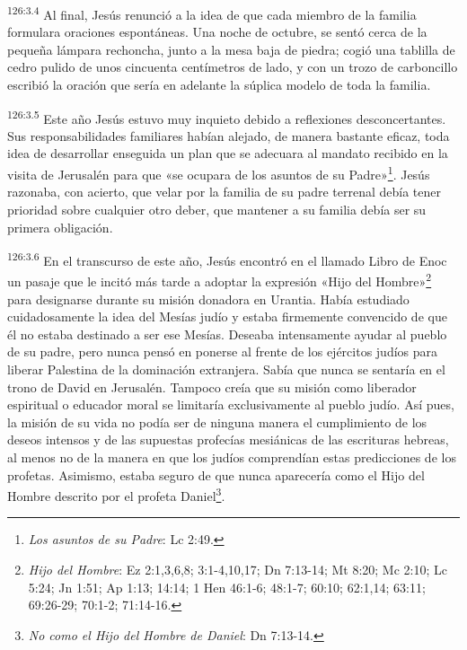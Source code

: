 \par 
\textsuperscript{126:3.4} Al final, Jesús renunció a la idea de que cada miembro de la familia formulara oraciones espontáneas. Una noche de octubre, se sentó cerca de la pequeña lámpara rechoncha, junto a la mesa baja de piedra; cogió una tablilla de cedro pulido de unos cincuenta centímetros de lado, y con un trozo de carboncillo escribió la oración que sería en adelante la súplica modelo de toda la familia.

\par 
\textsuperscript{126:3.5} Este año Jesús estuvo muy inquieto debido a reflexiones desconcertantes. Sus responsabilidades familiares habían alejado, de manera bastante eficaz, toda idea de desarrollar enseguida un plan que se adecuara al mandato recibido en la visita de Jerusalén para que «se ocupara de los asuntos de su Padre»\footnote{\textit{Los asuntos de su Padre}: Lc 2:49.}. Jesús razonaba, con acierto, que velar por la familia de su padre terrenal debía tener prioridad sobre cualquier otro deber, que mantener a su familia debía ser su primera obligación.

\par 
\textsuperscript{126:3.6} En el transcurso de este año, Jesús encontró en el llamado Libro de Enoc un pasaje que le incitó más tarde a adoptar la expresión «Hijo del Hombre»\footnote{\textit{Hijo del Hombre}: Ez 2:1,3,6,8; 3:1-4,10,17; Dn 7:13-14; Mt 8:20; Mc 2:10; Lc 5:24; Jn 1:51; Ap 1:13; 14:14; 1 Hen 46:1-6; 48:1-7; 60:10; 62:1,14; 63:11; 69:26-29; 70:1-2; 71:14-16.} para designarse durante su misión donadora en Urantia. Había estudiado cuidadosamente la idea del Mesías judío y estaba firmemente convencido de que él no estaba destinado a ser ese Mesías. Deseaba intensamente ayudar al pueblo de su padre, pero nunca pensó en ponerse al frente de los ejércitos judíos para liberar Palestina de la dominación extranjera. Sabía que nunca se sentaría en el trono de David en Jerusalén. Tampoco creía que su misión como liberador espiritual o educador moral se limitaría exclusivamente al pueblo judío. Así pues, la misión de su vida no podía ser de ninguna manera el cumplimiento de los deseos intensos y de las supuestas profecías mesiánicas de las escrituras hebreas, al menos no de la manera en que los judíos comprendían estas predicciones de los profetas. Asimismo, estaba seguro de que nunca aparecería como el Hijo del Hombre descrito por el profeta Daniel\footnote{\textit{No como el Hijo del Hombre de Daniel}: Dn 7:13-14.}.


